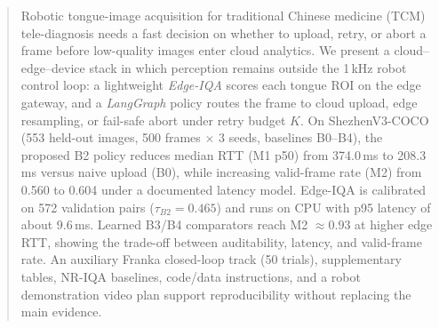 \begin{abstract}
Robotic tongue-image acquisition for traditional Chinese medicine (TCM) tele-diagnosis needs a fast decision on whether to upload, retry, or abort a frame before low-quality images enter cloud analytics.
We present a cloud--edge--device stack in which perception remains outside the 1\,kHz robot control loop: a lightweight \emph{Edge-IQA} scores each tongue ROI on the edge gateway, and a \emph{LangGraph} policy routes the frame to cloud upload, edge resampling, or fail-safe abort under retry budget $K$.
On ShezhenV3-COCO (553 held-out images, 500 frames $\times$ 3 seeds, baselines B0--B4), the proposed B2 policy reduces median RTT (M1 p50) from 374.0\,ms to 208.3\,ms versus naive upload (B0), while increasing valid-frame rate (M2) from 0.560 to 0.604 under a documented latency model.
Edge-IQA is calibrated on 572 validation pairs ($\tau_{B2}{=}0.465$) and runs on CPU with p95 latency of about 9.6\,ms.
Learned B3/B4 comparators reach M2 $\approx 0.93$ at higher edge RTT, showing the trade-off between auditability, latency, and valid-frame rate.
An auxiliary Franka closed-loop track (50 trials), supplementary tables, NR-IQA baselines, code/data instructions, and a robot demonstration video plan support reproducibility without replacing the main evidence.
\end{abstract}

